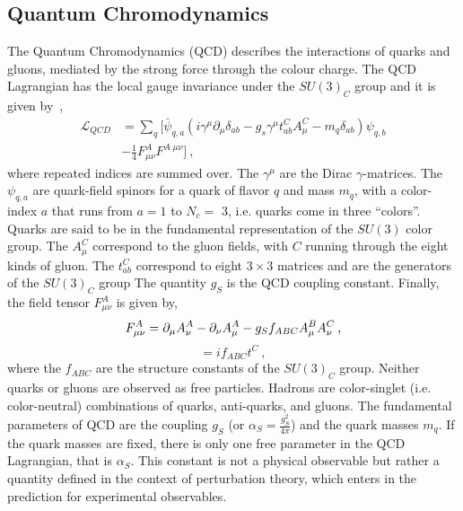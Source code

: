 \subsection*{Quantum Chromodynamics}
The Quantum Chromodynamics (QCD) describes  the interactions of quarks and gluons, mediated by
the strong force through the colour charge.  
The QCD Lagrangian has the local gauge invariance under the  $SU(3)_C$ group and it is given by~\cite{Beringer:1900zz},
\newline
\begin{equation}
\begin{split}
 \mathcal{L}_{QCD}&= \sum_q [\bar{\psi}_{q,a} ( i \gamma^{\mu} \partial_{\mu} \delta_{ab} -g_s \gamma^{\mu} t_{ab}^C A_{\mu}^C -m_q \delta_{ab})\psi_{q,b} \\
&-\frac{1}{4} F_{\mu \nu}^{A}  F^{A \; \mu \nu}] \: , \end{split}  \end{equation}
\newline
where repeated indices are summed over. The $\gamma^{\mu}$ are the Dirac $\gamma$-matrices.
The $\psi_{q,a}$ are quark-field spinors for a quark of flavor $q$ and mass $m_q$, with a color-index $a$
that runs from $a= 1$ to $N_c=$ 3, i.e. quarks come in three ``colors''. 
Quarks are said to be in the fundamental representation of the $SU(3)$ color group. 
The $A_{\mu}^C$ correspond to the gluon fields, with $C$ running through the eight kinds of gluon.
The $t_{ab}^C$ correspond to eight $3\times 3$ matrices and are the generators of the $SU(3)_C$ group
The quantity $g_S$ is the QCD coupling constant. Finally,
the field tensor $ F_{\mu \nu}^{A}$ is given by,
\newline
\begin{equation}
 F_{\mu \nu}^{A}=  \partial_{\mu} A_{\nu}^A  - \partial_{\nu} A_{\mu}^A -g_{\Large S} f_{ABC}A_{\mu}^B A_{\nu}^C  \: ,   \end{equation}
\begin{equation}
 [t^A, t^B]=i f_{ABC}t^C  \: ,   \end{equation}
\newline
where the $f_{ABC}$ are the structure constants of the $SU(3)_C$ group.
Neither quarks or gluons are observed as free particles. Hadrons are color-singlet (i.e. color-neutral) combinations of quarks, anti-quarks, and gluons.
The fundamental parameters of QCD are the coupling $g_S$ (or $\alpha_S= \frac{g_S^2}{4\pi}$) and the quark masses $m_q$.
If the quark masses are fixed, there is only one free parameter in the QCD Lagrangian, that is $\alpha_S$. This constant is not a physical observable but
rather  a quantity defined in the context of perturbation theory, which enters in the prediction for experimental observables.


